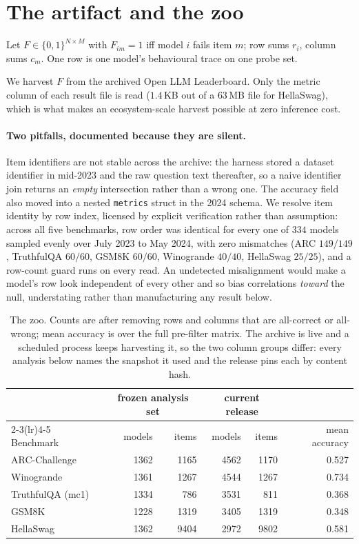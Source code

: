 \documentclass{article}
\begin{document}
\section{The artifact and the zoo}
\label{sec:data}

Let $F\in\{0,1\}^{N\times M}$ with $F_{im}=1$ iff model $i$ fails item $m$; row sums $r_i$, column
sums $c_m$. One row is one model's behavioural trace on one probe set.

We harvest $F$ from the archived Open LLM Leaderboard. Only the metric column of each result file
is read ($1.4$\,KB out of a $63$\,MB file for HellaSwag), which is what makes an
ecosystem-scale harvest possible at zero inference cost.

\paragraph{Two pitfalls, documented because they are silent.} Item identifiers are not stable
across the archive: the harness stored a dataset identifier in mid-2023 and the raw question text
thereafter, so a naive identifier join returns an \emph{empty} intersection rather than a wrong
one. The accuracy field also moved into a nested \texttt{metrics} struct in the 2024 schema. We
resolve item identity by row index, licensed by explicit verification rather than assumption:
across all five benchmarks, row order was identical for every one of $334$ models sampled evenly
over July 2023 to May 2024, with zero mismatches (ARC $149/149$, TruthfulQA $60/60$, GSM8K $60/60$,
Winogrande $40/40$, HellaSwag $25/25$), and a row-count guard runs on every read. An undetected
misalignment would make a model's row look independent of every other and so bias correlations
\emph{toward} the null, understating rather than manufacturing any result below.

\begin{table}[t]\centering\small
\begin{tabular}{lrrrrr}
\toprule
& \multicolumn{2}{c}{frozen analysis set} & \multicolumn{2}{c}{current release} & \\
\cmidrule(lr){2-3}\cmidrule(lr){4-5}
Benchmark & models & items & models & items & mean accuracy \\
\midrule
ARC-Challenge & 1362 & 1165 & 4562 & 1170 & 0.527 \\
Winogrande & 1361 & 1267 & 4544 & 1267 & 0.734 \\
TruthfulQA (mc1) & 1334 & 786 & 3531 & 811 & 0.368 \\
GSM8K & 1228 & 1319 & 3405 & 1319 & 0.348 \\
HellaSwag & 1362 & 9404 & 2972 & 9802 & 0.581 \\
\bottomrule
\end{tabular}
\caption{The zoo. Counts are after removing rows and columns that are all-correct or all-wrong;
mean accuracy is over the full pre-filter matrix. The archive is live and a scheduled process keeps
harvesting it, so the two column groups differ: every analysis below names the snapshot it used and
the release pins each by content hash.}
\label{tab:zoo}
\end{table}
\end{document}
